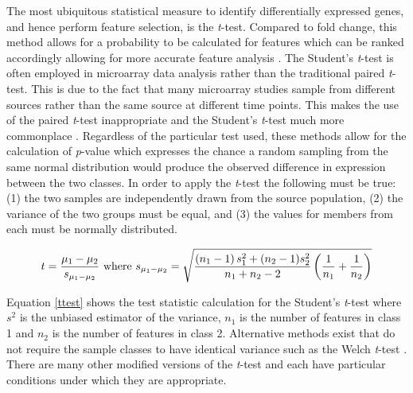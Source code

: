 The most ubiquitous statistical measure to identify
differentially expressed genes, and hence perform feature selection, is the
\emph{t}-test.  Compared to fold change, this method allows for a probability
to be calculated for features which can be ranked accordingly allowing for more
accurate feature analysis \cite{PMID_164182572}. The Student's \emph{t}-test is
often employed in microarray data analysis rather than the traditional paired
\emph{t}-test.  This is due to the fact that many microarray studies sample
from different sources rather than the same source at different time points.
This makes the use of the paired \emph{t}-test inappropriate and the Student's
\emph{t}-test much more commonplace
\cite{ma2003gep,bueno2004dtp,PMID_14871811}. Regardless of the particular test
used, these methods allow for the calculation of \emph{p}-value which expresses
the chance a random sampling from the same normal distribution would produce
the observed difference in expression between the two classes. In order to
apply the \emph{t}-test the following must be true: (1) the two samples are
independently drawn from the source population, (2) the variance of the two
groups must be equal, and (3) the values for members from each must be normally
distributed.

\begin{equation} \label{ttest}
t = { \mu_1 - \mu_2 \over s_{\mu_1 - \mu_2}}
 \ \mathrm{where}\ s_{\mu_1 - \mu_2} = \sqrt{{\left({n}_1 - 1\right) s_1^2 + ({n}_2 - 1) s_2^2  \over {n}_1 + {n}_2 - 2}\left({1 \over n_1} + {1 \over n_2}\right)}
\end{equation}

Equation \eqref{ttest} shows the test statistic calculation for the Student's
\emph{t}-test where $s^2$ is the unbiased estimator of the variance, ${n}_1$ is
the number of features in class 1 and ${n}_2$ is the number of features in
class 2.  Alternative methods exist that do not require the sample classes to
have identical variance such as the Welch \emph{t}-test \cite{PMID_142249476}.
There are many other modified versions of the \emph{t}-test and each have
particular conditions under which they are appropriate.


